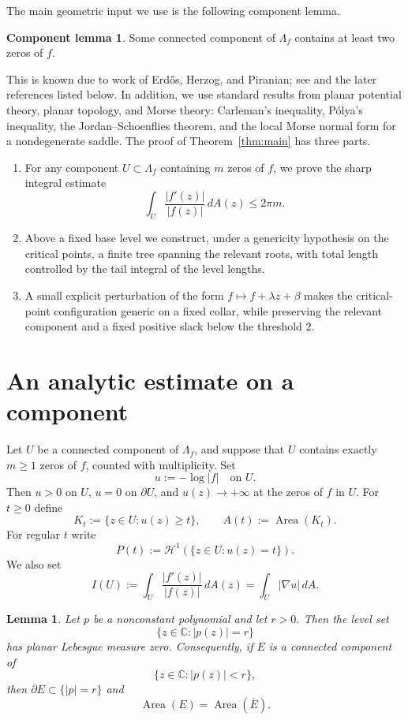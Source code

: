 \documentclass[12pt]{amsart}
\theoremstyle{definition}
\newtheorem{lemma}[theorem]{Lemma}
\newtheorem*{componentlemma}{Component lemma}
\theoremstyle{remark}
\begin{document}
The main geometric input we use is the following component lemma.

\begin{componentlemma}
Some connected component of $\Lambda_f$ contains at least two zeros of $f$.
\end{componentlemma}

\medskip
\noindent
This is known due to work of Erd\H{o}s, Herzog, and Piranian; see \cite{EHP58} and the later references listed below. 
In addition, we use standard results from planar potential theory, planar topology, and Morse theory: Carleman's inequality, P\'olya's inequality, the Jordan--Schoenflies theorem, and the local Morse normal form for a nondegenerate saddle.
\noindent The proof of Theorem~\ref{thm:main} has three parts.
\begin{enumerate}
\item For any component $U\subset \Lambda_f$ containing $m$ zeros of $f$, we prove the sharp integral estimate
\[
 \int_U \frac{|f'(z)|}{|f(z)|}\,dA(z)\le 2\pi m.
\]
\item Above a fixed base level we construct, under a genericity hypothesis on the critical points, a finite
      tree spanning the relevant roots, with total length controlled by the tail integral of the level lengths.
\item A small explicit perturbation of the form $f\mapsto f+\lambda z+\beta$ makes the critical-point configuration
      generic on a fixed collar, while preserving the relevant component and a fixed positive slack below the threshold $2$.
\end{enumerate}

\section{An analytic estimate on a component}

Let $U$ be a connected component of $\Lambda_f$, and suppose that $U$ contains exactly $m\ge 1$ zeros of $f$,
counted with multiplicity. Set
\[
 u:=-\log|f| \quad\text{on } U.
\]
Then $u>0$ on $U$, $u=0$ on $\partial U$, and $u(z)\to +\infty$ at the zeros of $f$ in $U$. For $t\ge 0$ define
\[
 K_t:=\{z\in U:u(z)\ge t\}, \qquad A(t):=\operatorname{Area}(K_t).
\]
For regular $t$ write
\[
 P(t):=\mathcal H^1(\{z\in U:u(z)=t\}).
\]
We also set
\[
 I(U):=\int_U \frac{|f'(z)|}{|f(z)|}\,dA(z)=\int_U |\nabla u|\,dA.
\]

\medskip
\begin{lemma}\label{lem:level-set-measure-zero}
\emph{Let $p$ be a nonconstant polynomial and let $r>0$. Then the level set
\[
 \{z\in\mathbb{C}: |p(z)|=r\}
\]
has planar Lebesgue measure zero. Consequently, if $E$ is a connected component of
\[
 \{z\in\mathbb{C}: |p(z)|<r\},
\]
then $\partial E\subset\{|p|=r\}$ and
\[
 \operatorname{Area}(E)=\operatorname{Area}(\overline E).
\]}
\end{lemma}
\end{document}
